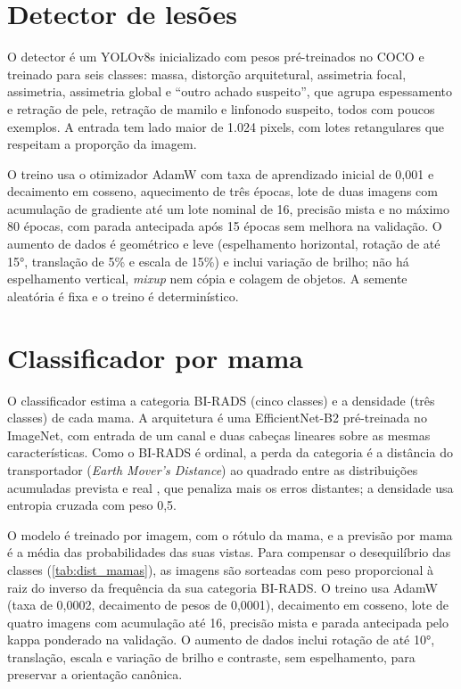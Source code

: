 \section{Detector de lesões}

O detector é um YOLOv8s \cite{jocher2023yolov8} inicializado com pesos pré-treinados no COCO e treinado para seis classes: massa, distorção arquitetural, assimetria focal, assimetria, assimetria global e ``outro achado suspeito'', que agrupa espessamento e retração de pele, retração de mamilo e linfonodo suspeito, todos com poucos exemplos. A entrada tem lado maior de 1.024 pixels, com lotes retangulares que respeitam a proporção da imagem.

O treino usa o otimizador AdamW com taxa de aprendizado inicial de 0,001 e decaimento em cosseno, aquecimento de três épocas, lote de duas imagens com acumulação de gradiente até um lote nominal de 16, precisão mista e no máximo 80 épocas, com parada antecipada após 15 épocas sem melhora na validação. O aumento de dados é geométrico e leve (espelhamento horizontal, rotação de até 15°, translação de 5\% e escala de 15\%) e inclui variação de brilho; não há espelhamento vertical, \textit{mixup} nem cópia e colagem de objetos. A semente aleatória é fixa e o treino é determinístico.


\section{Classificador por mama}

O classificador estima a categoria BI-RADS (cinco classes) e a densidade (três classes) de cada mama. A arquitetura é uma EfficientNet-B2 \cite{tan2019efficientnet} pré-treinada no ImageNet, com entrada de um canal e duas cabeças lineares sobre as mesmas características. Como o BI-RADS é ordinal, a perda da categoria é a distância do transportador (\textit{Earth Mover's Distance}) ao quadrado entre as distribuições acumuladas prevista e real \cite{hou2016emd}, que penaliza mais os erros distantes; a densidade usa entropia cruzada com peso 0,5.

O modelo é treinado por imagem, com o rótulo da mama, e a previsão por mama é a média das probabilidades das suas vistas. Para compensar o desequilíbrio das classes (\autoref{tab:dist_mamas}), as imagens são sorteadas com peso proporcional à raiz do inverso da frequência da sua categoria BI-RADS. O treino usa AdamW (taxa de 0,0002, decaimento de pesos de 0,0001), decaimento em cosseno, lote de quatro imagens com acumulação até 16, precisão mista e parada antecipada pelo kappa ponderado na validação. O aumento de dados inclui rotação de até 10°, translação, escala e variação de brilho e contraste, sem espelhamento, para preservar a orientação canônica.

